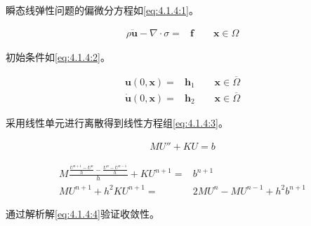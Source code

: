 瞬态线弹性问题的偏微分方程如\eqref{eq:4.1.4:1}。

\begin{align}\label{eq:4.1.4:1}
  \rho\ddot{\mathbf u}-\nabla\cdot\sigma=& \mathbf f \qquad \mathbf x\in\Omega
\end{align}

初始条件如\eqref{eq:4.1.4:2}。 
	
\begin{equation}\label{eq:4.1.4:2}
  \begin{split}
    \mathbf u(0,\mathbf x) = & \mathbf h_1 \qquad \mathbf x\in\overline\Omega\\
    \dot{\mathbf u}(0,\mathbf x) = & \mathbf h_2 \qquad \mathbf x\in\overline\Omega
  \end{split}
\end{equation}

采用线性单元进行离散得到线性方程组\eqref{eq:4.1.4:3}。

\begin{align}\label{eq:4.1.4:3}
   M U'' + KU = b
\end{align}

\begin{align*}
  M\frac{\frac{U^{n+1}-U^{n}}{h}-\frac{U^{n}-U^{n-1}}{h}}{h} + KU^{n+1} =& b^{n+1}\\
  MU^{n+1} + h^2KU^{n+1} =& 2MU^{n} - MU^{n-1} + h^2b^{n+1}
\end{align*}

通过解析解\eqref{eq:4.1.4:4}验证收敛性。

